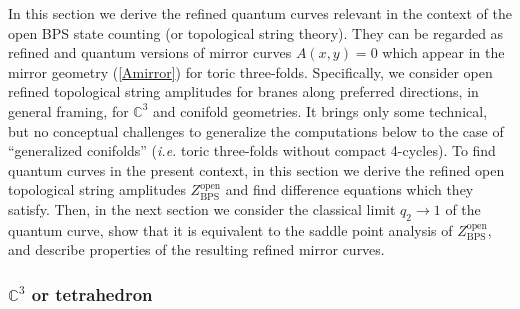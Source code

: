 \documentclass[hyper,letterpaper]{JHEP3}
\newcommand{\C}{{\mathbb C}}
\begin{document}
In this section we derive the refined quantum curves relevant in the context of the open BPS state counting (or topological string theory).
They can be regarded as refined and quantum versions of mirror curves $A(x,y)=0$ which appear in the mirror geometry (\ref{Amirror}) for toric three-folds. Specifically, we consider open refined topological string amplitudes for branes along preferred directions, in general framing, for $\C^3$ and conifold geometries. It brings only some technical, but no conceptual challenges to generalize the computations below to the case of ``generalized conifolds'' ({\it i.e.} toric three-folds without compact 4-cycles). To find quantum curves in the present context, in this section we derive the refined open topological string amplitudes $Z_{\text{BPS}}^{\text{open}}$ and find difference equations which they satisfy. Then, in the next section we consider the classical limit $q_2 \to 1$ of the quantum curve, show that it is equivalent to the saddle point analysis of $Z_{\text{BPS}}^{\text{open}}$, and describe properties of the resulting refined mirror curves.


\subsubsection*{$\C^3$ or tetrahedron}
\end{document}
